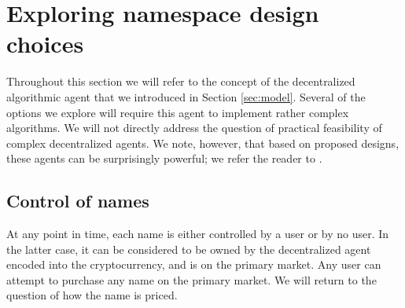 \section{Exploring namespace design choices}
\label{sec:design}

Throughout this section we will refer to the concept of the decentralized algorithmic agent that we introduced in Section \ref{sec:model}. Several of the options we explore will require this agent to implement rather complex algorithms. We will not directly address the question of practical feasibility of complex decentralized agents. We note, however, that based on proposed designs, these agents can be surprisingly powerful; we refer the reader to \cite{WEIS2014,ethereum,...}.



\subsection{Control of names}
At any point in time, each name is either controlled by a user or by no user. In the latter case, it can be considered to be owned by the decentralized agent encoded into the cryptocurrency, and is on the primary market. Any user can attempt to purchase any name on the primary market. We will return to the question of how the name is priced. 

